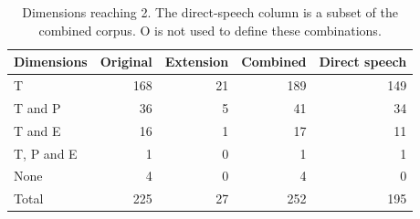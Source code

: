\begin{table}[htbp]
\centering\small
\caption{Dimensions reaching 2. The direct-speech column is a subset of the combined corpus. O is not used to define these combinations.}
\label{tab:patterns}
\begin{tabular}{lrrrr}
\toprule
Dimensions & Original & Extension & Combined & Direct speech \\
\midrule
T & 168 & 21 & 189 & 149 \\
T and P & 36 & 5 & 41 & 34 \\
T and E & 16 & 1 & 17 & 11 \\
T, P and E & 1 & 0 & 1 & 1 \\
None & 4 & 0 & 4 & 0 \\
\midrule
Total & 225 & 27 & 252 & 195 \\
\bottomrule
\end{tabular}
\end{table}
